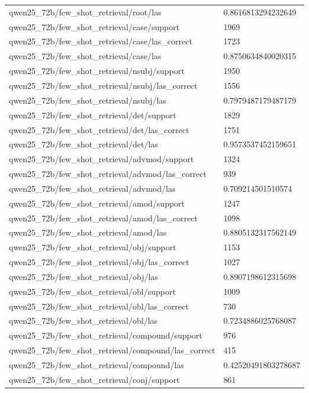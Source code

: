 \begin{tabular}{ll}
qwen25\_72b/few\_shot\_retrieval/root/las & 0.8616813294232649 \\
qwen25\_72b/few\_shot\_retrieval/case/support & 1969 \\
qwen25\_72b/few\_shot\_retrieval/case/las\_correct & 1723 \\
qwen25\_72b/few\_shot\_retrieval/case/las & 0.8750634840020315 \\
qwen25\_72b/few\_shot\_retrieval/nsubj/support & 1950 \\
qwen25\_72b/few\_shot\_retrieval/nsubj/las\_correct & 1556 \\
qwen25\_72b/few\_shot\_retrieval/nsubj/las & 0.7979487179487179 \\
qwen25\_72b/few\_shot\_retrieval/det/support & 1829 \\
qwen25\_72b/few\_shot\_retrieval/det/las\_correct & 1751 \\
qwen25\_72b/few\_shot\_retrieval/det/las & 0.9573537452159651 \\
qwen25\_72b/few\_shot\_retrieval/advmod/support & 1324 \\
qwen25\_72b/few\_shot\_retrieval/advmod/las\_correct & 939 \\
qwen25\_72b/few\_shot\_retrieval/advmod/las & 0.709214501510574 \\
qwen25\_72b/few\_shot\_retrieval/amod/support & 1247 \\
qwen25\_72b/few\_shot\_retrieval/amod/las\_correct & 1098 \\
qwen25\_72b/few\_shot\_retrieval/amod/las & 0.8805132317562149 \\
qwen25\_72b/few\_shot\_retrieval/obj/support & 1153 \\
qwen25\_72b/few\_shot\_retrieval/obj/las\_correct & 1027 \\
qwen25\_72b/few\_shot\_retrieval/obj/las & 0.8907198612315698 \\
qwen25\_72b/few\_shot\_retrieval/obl/support & 1009 \\
qwen25\_72b/few\_shot\_retrieval/obl/las\_correct & 730 \\
qwen25\_72b/few\_shot\_retrieval/obl/las & 0.7234886025768087 \\
qwen25\_72b/few\_shot\_retrieval/compound/support & 976 \\
qwen25\_72b/few\_shot\_retrieval/compound/las\_correct & 415 \\
qwen25\_72b/few\_shot\_retrieval/compound/las & 0.42520491803278687 \\
qwen25\_72b/few\_shot\_retrieval/conj/support & 861 \\

\end{tabular}

